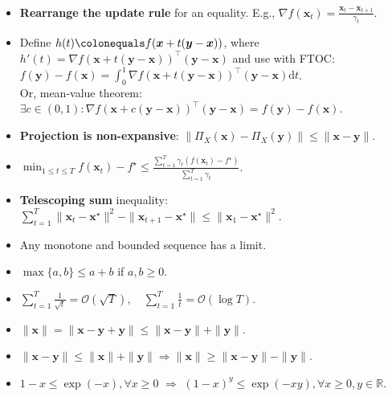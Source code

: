 \documentclass[8pt,a4paper]{extarticle}
\newcommand{\R}{\mathbb{R}}
\renewcommand{\vec}[1]{\bm{#1}}
\newenvironment{topic}[1]
{\textbf{\sffamily \colorbox{black}{\rlap{\textbf{\textcolor{white}{#1}}}\hspace{\linewidth}\hspace{-2\fboxsep}}} \\ \vspace{0.2cm}}
{}
\begin{document}
\begin{multicols*}{2}
    \begin{topic}{Common tricks}
        \begin{itemize}
            \item \textbf{Rearrange the update rule} for an equality. E.g., $\nabla f(\vec{x}_t) = \frac{\vec{x}_t -
                          \vec{x}_{t+1}}{\gamma_t}$.
            \item Define $h(t) \colonequals f(\vec{x} + t(\vec{y} - \vec{x}))$, where $h'(t) = \nabla f(\vec{x} +
                      t(\vec{y} - \vec{x}))^\top (\vec{y} - \vec{x})$ and use with FTOC: $f(\vec{y}) - f(\vec{x}) =
                      \int_0^1 \nabla f(\vec{x} + t(\vec{y} - \vec{x}))^\top (\vec{y} - \vec{x}) \mathrm{d}t$. \\ Or,
                  mean-value theorem: $\exists c \in (0,1) : \nabla f(\vec{x} + c(\vec{y} - \vec{x}))^\top (\vec{y} -
                      \vec{x}) = f(\vec{y}) - f(\vec{x})$.
            \item \textbf{Projection is non-expansive}: $\| \Pi_X(\vec{x}) - \Pi_X(\vec{y}) \| \leq \| \vec{x} -
                      \vec{y} \|$.
            \item $\min_{1 \leq t \leq T} f(\vec{x}_t) - f^\star \leq \frac{\sum_{t=1}^{T} \gamma_t (f(\vec{x}_t) - f^\star)}{\sum_{t=1}^{T} \gamma_t}$.
            \item \textbf{Telescoping sum} inequality: $\sum_{t=1}^{T} \| \vec{x}_t - \vec{x}^\star \|^2 - \| \vec{x}_{t+1} -
                      \vec{x}^\star \| \leq \| \vec{x}_1 - \vec{x}^\star \|^2$.
            \item Any monotone and bounded sequence has a limit.
            \item $\max \{ a,b \} \leq a + b$ if $a,b \geq 0$.
            \item $\sum_{t=1}^{T} \frac{1}{\sqrt{t}} = \mathcal{O}(\sqrt{T}), \quad \sum_{t=1}^{T} \frac{1}{t} = \mathcal{O}(\log T)$.
            \item $\| \vec{x} \| = \| \vec{x} - \vec{y} + \vec{y} \| \leq \| \vec{x} - \vec{y} \| + \| \vec{y} \|$.
            \item $\| \vec{x} - \vec{y} \| \leq \| \vec{x} \| + \| \vec{y} \| \Rightarrow \| \vec{x} \| \geq \| \vec{x} - \vec{y} \| - \| \vec{y} \|$.
            \item $1 - x \leq \exp(-x), \forall x \geq 0$ $\Rightarrow$ $(1-x)^y \leq \exp(-xy), \forall x \geq 0, y \in \R$.
        \end{itemize}
    \end{topic}


\end{multicols*}
\end{document}
